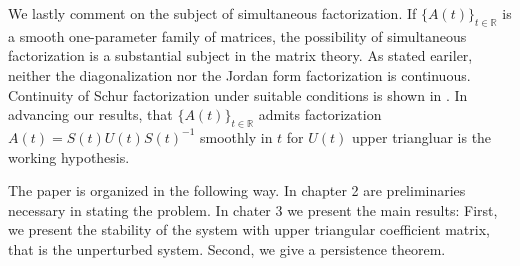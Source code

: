 \documentclass[a4paper,11pt]{article}
\newcounter{Theorem}
\theoremstyle{remark}
\begin{document}
We lastly comment on the subject of simultaneous factorization. If $\{A(t)\}_{t\in \mathbb{R}}$ is a smooth one-parameter family of matrices, the possibility of simultaneous factorization is a substantial subject in the matrix theory. As stated eariler, neither the diagonalization nor the Jordan form factorization is continuous.  Continuity of Schur factorization under suitable conditions is shown in \cite{DE99}. In advancing our results, that $\{A(t)\}_{t\in \mathbb{R}}$ admits factorization $A(t) =  S(t)U(t)S(t)^{-1}$ smoothly in $t$ for $U(t)$ upper triangluar is the working hypothesis. 







The paper is organized in the following way. In chapter 2 are preliminaries necessary in stating the problem. In chater 3 we present the main results: First, we present the stability of the system with upper triangular coefficient matrix,  that is the unperturbed system. Second, we give a persistence theorem.
\end{document}
